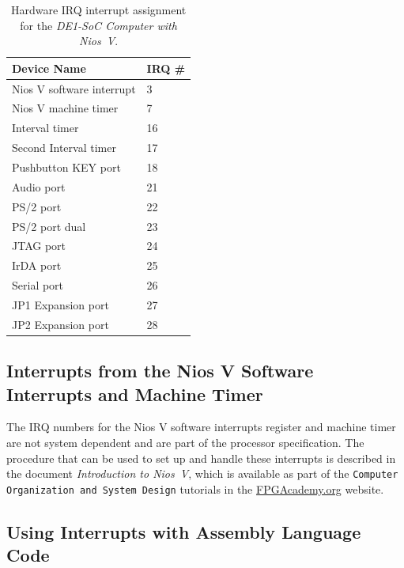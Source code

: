 \documentclass[11pt, twoside, pdftex]{article}
\newcommand{\commonFiles}{../../../common/doc}
\newcommand{\systemNameFull}{DE1-SoC Computer with Nios~V}
\newcommand{\processor}{Nios~V}
\begin{document}
\begin{table}[h]
    \begin{center}
    \begin{tabular}{l|l}
            \textbf{Device Name} &
            \textbf{IRQ \#}
        \\\hline
            Nios V software interrupt & 3 \\
            Nios V machine timer & 7 \\
            Interval timer & 16 \\
            Second Interval timer & 17 \\
            Pushbutton KEY port & 18 \\
            Audio port & 21 \\
            PS/2 port & 22 \\
            PS/2 port dual & 23 \\
            JTAG port & 24 \\
			IrDA port & 25 \\
            Serial port & 26 \\
            JP1 Expansion port & 27 \\
            JP2 Expansion port & 28 \\
    \end{tabular}
    \caption{Hardware IRQ interrupt assignment for the {\it \systemNameFull}.}
	 \label{tab:irq}
    \end{center}
\end{table}

\subsection{Interrupts from the Nios V Software Interrupts and Machine Timer}
The IRQ numbers for the Nios V software interrupts register and machine timer are not
system dependent and are part of the processor specification. The procedure that can be used
to set up and handle these interrupts is described in the 
document {\it Introduction to \processor}, which is available as part of the 
\texttt{Computer Organization and System Design} tutorials in the 
{\small \href{https://www.fpgacademy.org/tutorials.html} {FPGAcademy.org}} website.






\subsection{Using Interrupts with Assembly Language Code}
\end{document}
